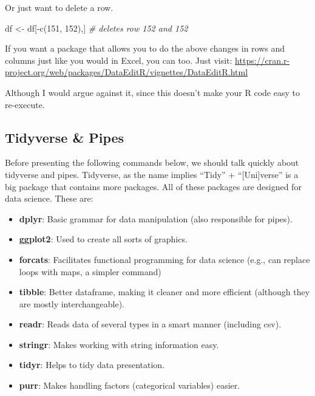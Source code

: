 \documentclass[
]{book}
\newenvironment{Shaded}{\begin{snugshade}}{\end{snugshade}}
\newcommand{\CommentTok}[1]{\textcolor[rgb]{0.56,0.35,0.01}{\textit{#1}}}
\newcommand{\DecValTok}[1]{\textcolor[rgb]{0.00,0.00,0.81}{#1}}
\newcommand{\FunctionTok}[1]{\textcolor[rgb]{0.00,0.00,0.00}{#1}}
\newcommand{\NormalTok}[1]{#1}
\newcommand{\OtherTok}[1]{\textcolor[rgb]{0.56,0.35,0.01}{#1}}
\newcommand{\SpecialCharTok}[1]{\textcolor[rgb]{0.00,0.00,0.00}{#1}}
\begin{document}
Or just want to delete a row.

\begin{Shaded}
\begin{Highlighting}[]
\NormalTok{df }\OtherTok{\textless{}{-}}\NormalTok{ df[}\SpecialCharTok{{-}}\FunctionTok{c}\NormalTok{(}\DecValTok{151}\NormalTok{, }\DecValTok{152}\NormalTok{),]  }\CommentTok{\# deletes row 152 and 152}
\end{Highlighting}
\end{Shaded}

If you want a package that allows you to do the above changes in rows and columns just like you would in Excel, you can too.
Just visit: \url{https://cran.r-project.org/web/packages/DataEditR/vignettes/DataEditR.html}

Although I would argue against it, since this doesn't make your R code easy to re-execute.

\hypertarget{tidyverse-pipes}{%
\subsection{Tidyverse \& Pipes}\label{tidyverse-pipes}}

Before presenting the following commands below, we should talk quickly about tidyverse and pipes.
Tidyverse, as the name implies ``Tidy'' + ``{[}Uni{]}verse'' is a big package that contains more packages.
All of these packages are designed for data science.
These are:

\begin{itemize}
\item
  \textbf{dplyr}: Basic grammar for data manipulation (also responsible for pipes).
\item
  \textbf{ggplot2}: Used to create all sorts of graphics.
\item
  \textbf{forcats}: Facilitates functional programming for data science (e.g., can replace loops with maps, a simpler command)
\item
  \textbf{tibble}: Better dataframe, making it cleaner and more efficient (although they are mostly interchangeable).
\item
  \textbf{readr}: Reads data of several types in a smart manner (including csv).
\item
  \textbf{stringr}: Makes working with string information easy.
\item
  \textbf{tidyr}: Helps to tidy data presentation.
\item
  \textbf{purr}: Makes handling factors (categorical variables) easier.
\end{itemize}
\end{document}

